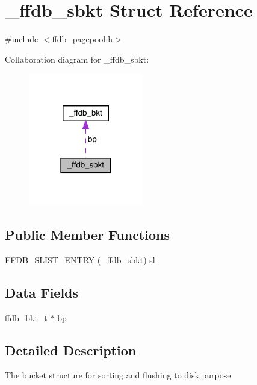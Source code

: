 \hypertarget{struct__ffdb__sbkt}{}\section{\+\_\+ffdb\+\_\+sbkt Struct Reference}
\label{struct__ffdb__sbkt}


{\ttfamily \#include $<$ffdb\+\_\+pagepool.\+h$>$}



Collaboration diagram for \+\_\+ffdb\+\_\+sbkt\+:\nopagebreak
\begin{figure}[H]
\begin{center}
\leavevmode
\includegraphics[width=142pt]{d9/d2f/struct__ffdb__sbkt__coll__graph}
\end{center}
\end{figure}
\subsection*{Public Member Functions}
\begin{DoxyCompactItemize}
\item 
\mbox{\hyperlink{struct__ffdb__sbkt_a63f40d019cc51c813c024f7939999003}{F\+F\+D\+B\+\_\+\+S\+L\+I\+S\+T\+\_\+\+E\+N\+T\+RY}} (\mbox{\hyperlink{struct__ffdb__sbkt}{\+\_\+ffdb\+\_\+sbkt}}) sl
\end{DoxyCompactItemize}
\subsection*{Data Fields}
\begin{DoxyCompactItemize}
\item 
\mbox{\hyperlink{ffdb__pagepool_8h_a7d7436d10d66de8bbe2325c37cd7a5ef}{ffdb\+\_\+bkt\+\_\+t}} $\ast$ \mbox{\hyperlink{struct__ffdb__sbkt_a777816cc2d046ff74eea9c6262c561c4}{bp}}
\end{DoxyCompactItemize}


\subsection{Detailed Description}
The bucket structure for sorting and flushing to disk purpose 

